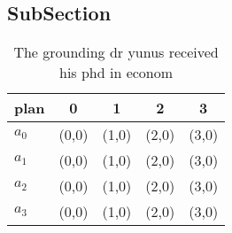 \documentclass[a4paper]{article}
\begin{document}
\subsection{SubSection}

\begin{table}
\begin{adjustbox}{width=0.5\columnwidth}
\begin{tabular}{|l|l|l|l|l|}
\hline
\textbf{plan} & \multicolumn{1}{c|}{\textbf{0}} & \multicolumn{1}{c|}{\textbf{1}} & \multicolumn{1}{c|}{\textbf{2}} & \multicolumn{1}{c|}{\textbf{3}} \\ \hline
\textbf{$a_0$}  & (0,0) & (1,0) & (2,0) & (3,0) \\ \hline
\textbf{$a_1$}  & (0,0) & (1,0) & (2,0) & (3,0) \\ \hline
\textbf{$a_2$}  & (0,0) & (1,0) & (2,0) & (3,0) \\ \hline
\textbf{$a_3$}  & (0,0) & (1,0) & (2,0) & (3,0) \\ \hline
\end{tabular}
\end{adjustbox}
\caption{The grounding dr yunus received his phd in econom
}
\end{table}
\end{document}
